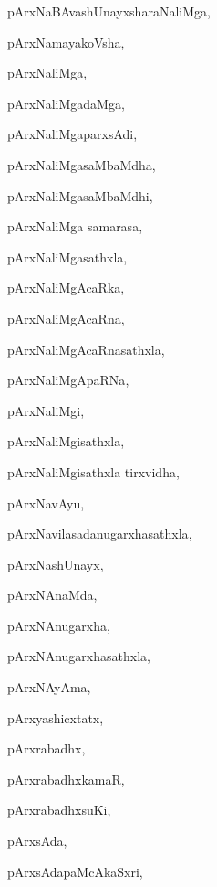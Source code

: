 \begin{multicols}{2}
{pArxNaBAvashUnayxsharaNaliMga}, \pageref{pArxNaBAvashUnayxsharaNaliMga}

{pArxNamayakoVsha}, \pageref{pArxNamayakoVsha}

{pArxNaliMga}, \pageref{pArxNaliMga}

{pArxNaliMgadaMga}, \pageref{pArxNaliMgadaMga}

{pArxNaliMgaparxsAdi}, \pageref{pArxNaliMgaparxsAdi}

{pArxNaliMgasaMbaMdha}, \pageref{pArxNaliMgasaMbaMdha}

{pArxNaliMgasaMbaMdhi}, \pageref{pArxNaliMgasaMbaMdhi}

{pArxNaliMga samarasa}, \pageref{pArxNaliMga samarasa}

{pArxNaliMgasathxla}, \pageref{pArxNaliMgasathxla}

{pArxNaliMgAcaRka}, \pageref{pArxNaliMgAcaRka}

{pArxNaliMgAcaRna}, \pageref{pArxNaliMgAcaRna}

{pArxNaliMgAcaRnasathxla}, \pageref{pArxNaliMgAcaRnasathxla}

{pArxNaliMgApaRNa}, \pageref{pArxNaliMgApaRNa}

{pArxNaliMgi}, \pageref{pArxNaliMgi}

{pArxNaliMgisathxla}, \pageref{pArxNaliMgisathxla}

{pArxNaliMgisathxla tirxvidha}, \pageref{pArxNaliMgisathxla tirxvidha}

{pArxNavAyu}, \pageref{pArxNavAyu}

{pArxNavilasadanugarxhasathxla}, \pageref{pArxNavilasadanugarxhasathxla}

{pArxNashUnayx}, \pageref{pArxNashUnayx}

{pArxNAnaMda}, \pageref{pArxNAnaMda}

{pArxNAnugarxha}, \pageref{pArxNAnugarxha}

{pArxNAnugarxhasathxla}, \pageref{pArxNAnugarxhasathxla}

{pArxNAyAma}, \pageref{pArxNAyAma}

{pArxyashicxtatx}, \pageref{pArxyashicxtatx}

{pArxrabadhx}, \pageref{pArxrabadhx}

{pArxrabadhxkamaR}, \pageref{pArxrabadhxkamaR}

{pArxrabadhxsuKi}, \pageref{pArxrabadhxsuKi}

{pArxsAda}, \pageref{pArxsAda}

{pArxsAdapaMcAkaSxri}, \pageref{pArxsAdapaMcAkaSxri}


\end{multicols}
